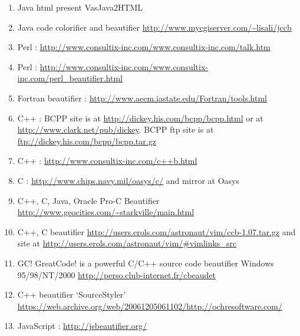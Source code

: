 \begin{sloppypar}
\begin{myquote}
\begin{enumerate}[leftmargin=*]
        \item Java html present VasJava2HTML
        \item Java code colorifier and beautifier \url{http://www.mycgiserver.com/~lisali/jccb}
        \item Perl : \url{http://www.consultix-inc.com/www.consultix-inc.com/talk.htm}
        \item Perl : \url{http://www.consultix-inc.com/www.consultix-inc.com/perl_beautifier.html}
        \item Fortran beautifier : \url{http://www.aeem.iastate.edu/Fortran/tools.html}

        \item C++ : BCPP site is at \url{http://dickey.his.com/bcpp/bcpp.html} or at \url{http://www.clark.net/pub/dickey}.
        BCPP ftp site is at \url{ftp://dickey.his.com/bcpp/bcpp.tar.gz}

        \item C++ : \url{http://www.consultix-inc.com/c++b.html}
        \item C : \url{http://www.chips.navy.mil/oasys/c/} and mirror at Oasys
        \item C++, C, Java, Oracle Pro-C Beautifier \url{http://www.geocities.com/~starkville/main.html}

        \item C++, C beautifier \url{http://users.erols.com/astronaut/vim/ccb-1.07.tar.gz} and site at
        \url{http://users.erols.com/astronaut/vim/#vimlinks_src}

        \item GC! GreatCode! is a powerful C/C++ source code beautifier Windows 95/98/NT/2000
        \url{http://perso.club-internet.fr/cbeaudet}

        \item C++ beautifier `SourceStyler' \url{https://web.archive.org/web/20061205061102/http://ochresoftware.com/}
        \item JavaScript : \url{http://jsbeautifier.org/}

    \end{enumerate}
    \end{myquote}
    \end{sloppypar}

